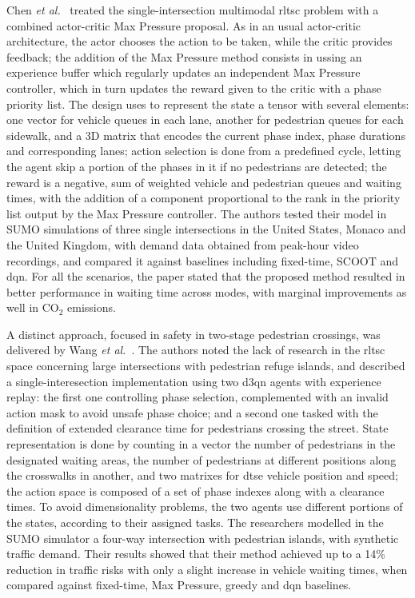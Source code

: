 Chen \textit{et al.}~\cite{Chen2025} treated the single-intersection multimodal \gls{rltsc} problem with a combined actor-critic Max Pressure proposal. As in an usual actor-critic architecture, the actor chooses the action to be taken, while the critic provides feedback; the addition of the Max Pressure method consists in ussing an experience buffer which regularly updates an independent Max Pressure controller, which in turn updates the reward given to the critic with a phase priority list. The design uses to represent the state a tensor with several elements: one vector for vehicle queues in each lane, another for pedestrian queues for each sidewalk, and a 3D matrix that encodes the current phase index, phase durations and corresponding lanes; action selection is done from a predefined cycle, letting the agent skip a portion of the phases in it if no pedestrians are detected; the reward is a negative, sum of weighted vehicle and pedestrian queues and waiting times, with the addition of a component proportional to the rank in the priority list output by the Max Pressure controller. The authors tested their model in SUMO simulations of three single intersections in the United States, Monaco and the United Kingdom, with demand data obtained from peak-hour video recordings, and compared it against baselines including fixed-time, SCOOT and \gls{dqn}. For all the scenarios, the paper stated that the proposed method resulted in better performance in waiting time across modes, with marginal improvements as well in CO$_2$ emissions.

A distinct approach, focused in safety in two-stage pedestrian crossings, was delivered by Wang \textit{et al.}~\cite{Wang2025}. The authors noted the lack of research in the \gls{rltsc} space concerning large intersections with pedestrian refuge islands, and described a single-interesection implementation using two \gls{d3qn} agents with experience replay: the first one controlling phase selection, complemented with an invalid action mask to avoid unsafe phase choice; and a second one tasked with the definition of extended clearance time for pedestrians crossing the street. State representation is done by counting in a vector the number of pedestrians in the designated waiting areas, the number of pedestrians at different positions along the crosswalks in another, and two matrixes for \gls{dtse} vehicle position and speed; the action space is composed of a set of phase indexes along with a clearance times. To avoid dimensionality problems, the two agents use different portions of the states, according to their assigned tasks. The researchers modelled in the SUMO simulator a four-way intersection with pedestrian islands, with synthetic traffic demand. Their results showed that their method achieved up to a 14\% reduction in traffic risks with only a slight increase in vehicle waiting times, when compared against fixed-time, Max Pressure, greedy and \gls{dqn} baselines.

